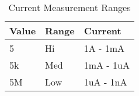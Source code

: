 \begin{table}[ht!]
\centering
\begin{tabular}{|l|l|l|}
\hline
Value & Range & Current   \\ \hline
5     & Hi    & 1A  - 1mA \\ \hline
5k    & Med   & 1mA - 1uA \\ \hline
5M    & Low   & 1uA - 1nA \\ \hline
\end{tabular}
\caption{Current Measurement Ranges}
\label{imeas_table}
\end{table}
